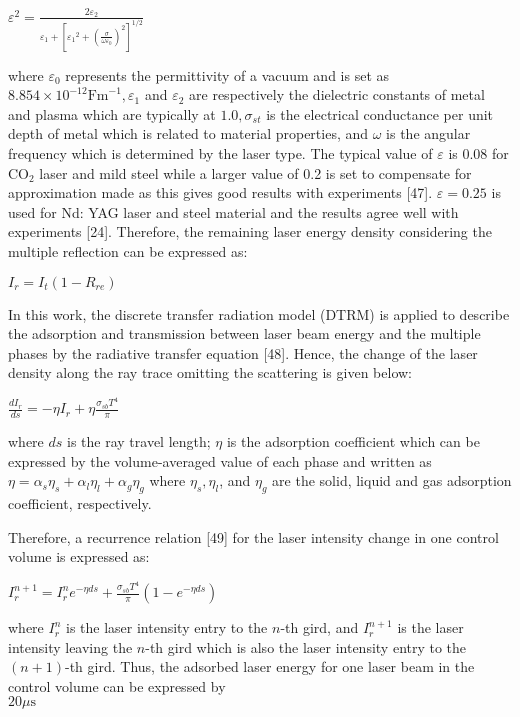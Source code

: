\documentclass[10pt]{article}
\begin{document}
$\varepsilon^{2}=\frac{2 \varepsilon_{2}}{\varepsilon_{1}+\left[\varepsilon_{1}{ }^{2}+\left(\frac{\sigma}{\omega \varepsilon_{0}}\right)^{2}\right]^{1 / 2}}$

where $\varepsilon_{0}$ represents the permittivity of a vacuum and is set as $8.854 \times 10^{-12} \mathrm{Fm}^{-1}, \varepsilon_{1}$ and $\varepsilon_{2}$ are respectively the dielectric constants of metal and plasma which are typically at $1.0, \sigma_{s t}$ is the electrical conductance per unit depth of metal which is related to material properties, and $\omega$ is the angular frequency which is determined by the laser type. The typical value of $\varepsilon$ is 0.08 for $\mathrm{CO}_{2}$ laser and mild steel while a larger value of 0.2 is set to compensate for approximation made as this gives good results with experiments [47]. $\varepsilon=0.25$ is used for Nd: YAG laser and steel material and the results agree well with experiments [24]. Therefore, the remaining laser energy density considering the multiple reflection can be expressed as:

$I_{r}=I_{t}\left(1-R_{r e}\right)$

In this work, the discrete transfer radiation model (DTRM) is applied to describe the adsorption and transmission between laser beam energy and the multiple phases by the radiative transfer equation [48]. Hence, the change of the laser density along the ray trace omitting the scattering is given below:

$\frac{d I_{r}}{d s}=-\eta I_{r}+\eta \frac{\sigma_{s b} T^{4}}{\pi}$

where $d s$ is the ray travel length; $\eta$ is the adsorption coefficient which can be expressed by the volume-averaged value of each phase and written as $\eta=\alpha_{s} \eta_{s}+\alpha_{l} \eta_{l}+\alpha_{g} \eta_{g}$ where $\eta_{s}, \eta_{l}$, and $\eta_{g}$ are the solid, liquid and gas adsorption coefficient, respectively.

Therefore, a recurrence relation [49] for the laser intensity change in one control volume is expressed as:

$I_{r}^{n+1}=I_{r}^{n} e^{-\eta d s}+\frac{\sigma_{s b} T^{4}}{\pi}\left(1-e^{-\eta d s}\right)$

where $I_{r}^{n}$ is the laser intensity entry to the $n$-th gird, and $I_{r}^{n+1}$ is the laser intensity leaving the $n$-th gird which is also the laser intensity entry to the $(n+1)$-th gird. Thus, the adsorbed laser energy for one laser beam in the control volume can be expressed by\\
$20 \mu \mathrm{s}$
\end{document}
